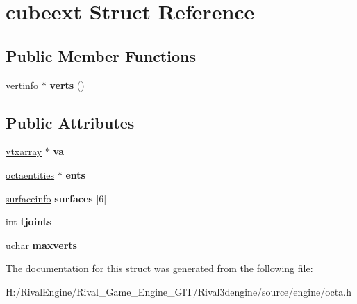 \hypertarget{structcubeext}{}\section{cubeext Struct Reference}
\label{structcubeext}
\subsection*{Public Member Functions}
\begin{DoxyCompactItemize}
\item 
\mbox{\label{structcubeext_adc92712b47146c4aafb2e030b8275b23}} 
\hyperlink{structvertinfo}{vertinfo} $\ast$ {\bfseries verts} ()
\end{DoxyCompactItemize}
\subsection*{Public Attributes}
\begin{DoxyCompactItemize}
\item 
\mbox{\label{structcubeext_a126ac675e7d3f34953f046f9f329f8e3}} 
\hyperlink{structvtxarray}{vtxarray} $\ast$ {\bfseries va}
\item 
\mbox{\label{structcubeext_aefebd2583240fe66f9a35f4d4d742dc1}} 
\hyperlink{structoctaentities}{octaentities} $\ast$ {\bfseries ents}
\item 
\mbox{\label{structcubeext_a2c778df7ae4b2c6606a8396d06604769}} 
\hyperlink{structsurfaceinfo}{surfaceinfo} {\bfseries surfaces} \mbox{[}6\mbox{]}
\item 
\mbox{\label{structcubeext_a2507cea49955710785ea9bdf8de4fff7}} 
int {\bfseries tjoints}
\item 
\mbox{\label{structcubeext_a09a7f8f515ef1c0108bc98a4d5682612}} 
uchar {\bfseries maxverts}
\end{DoxyCompactItemize}


The documentation for this struct was generated from the following file\+:\begin{DoxyCompactItemize}
\item 
H\+:/\+Rival\+Engine/\+Rival\+\_\+\+Game\+\_\+\+Engine\+\_\+\+G\+I\+T/\+Rival3dengine/source/engine/octa.\+h\end{DoxyCompactItemize}
